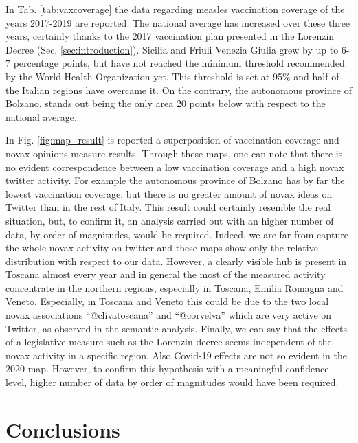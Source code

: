 \documentclass[prb,twocolumn,9pt]{revtex4-1}
\begin{document}
In Tab. \ref{tab:vaxcoverage} the data regarding measles vaccination coverage of the years 2017-2019 \cite{ministerosalute} are reported. The national average has increased over these three years, certainly thanks to the 2017 vaccination plan presented in the Lorenzin Decree (Sec. \ref{sec:introduction}). Sicilia and Friuli Venezia Giulia grew by up to 6-7 percentage points, but have not  reached the minimum threshold recommended by the World Health Organization yet. This threshold is set at 95$\%$ \cite{ministerosalute} and half of the Italian regions have overcame it. On the contrary, the autonomous province of Bolzano, stands out being the only area 20 points below with respect to the national average.


In Fig. \ref{fig:map_result} is reported a superposition of vaccination coverage and novax opinions measure results. Through these maps, one can note that there is no evident correspondence between a low vaccination coverage and a high novax twitter activity. For example the autonomous province of Bolzano has by far the lowest vaccination coverage, but there is no greater amount of novax ideas on Twitter than in the rest of Italy. This result could certainly resemble the real situation, but, to confirm it, an analysis carried out with an higher number of data, by order of magnitudes, would be required. Indeed, we are far from capture the whole novax activity on twitter and these maps show only the relative distribution with respect to our data. However, a clearly visible hub is present in Toscana almost every year and in general the most of the measured activity concentrate in the northern regions, especially in Toscana, Emilia Romagna and Veneto. Especially, in Toscana and Veneto this could be due to the two local novax associations “@clivatoscana” and “@corvelva” which are very active on Twitter, as observed in the semantic analysis. Finally, we can say that the effects of a legislative measure such as the Lorenzin decree seems independent of the novax activity in a specific region. Also Covid-19 effects are not so evident in the 2020 map. However, to confirm this hypothesis with a meaningful confidence level, higher number of data by order of magnitudes would have been required.




\section{Conclusions}
\label{sec:conclusions}
\end{document}
